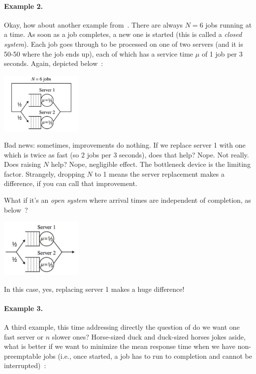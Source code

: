 \documentclass[a4paper]{report}
\begin{document}
\paragraph{Example 2.} Okay, how about another example from~\cite{pmd}. There are always $N=6$ jobs running at a time. As soon as a job completes, a new one is started (this is called a \textit{closed system}). Each job goes through to be processed on one of two servers (and it is 50-50 where the job ends up), each of which has a service time $\mu$ of 1 job per 3 seconds. Again, depicted below~\cite{pmd}:


\begin{center}
	\includegraphics[width=0.3\textwidth]{images/qt-example2.png}
\end{center}

Bad news: sometimes, improvements do nothing. If we replace server 1 with one which is twice as fast (so 2 jobs per 3 seconds), does that help? Nope. Not really. Does raising $N$ help? Nope, negligible effect. The bottleneck device is the limiting factor. Strangely, dropping $N$ to 1 means the server replacement makes a difference, if you can call that improvement. 

What if it's an \textit{open system} where arrival times are independent of completion, as below~\cite{pmd}?


\begin{center}
	\includegraphics[width=0.3\textwidth]{images/qt-example2-2.png}
\end{center}

In this case, yes, replacing server 1 makes a huge difference!

\paragraph{Example 3.} A third example, this time addressing directly the question of do we want one fast server or $n$ slower ones? Horse-sized duck and duck-sized horses jokes aside, what is better if we want to minimize the mean response time when we have non-preemptable jobs (i.e., once started, a job has to run to completion and cannot be interrupted)~\cite{pmd}:
\end{document}
